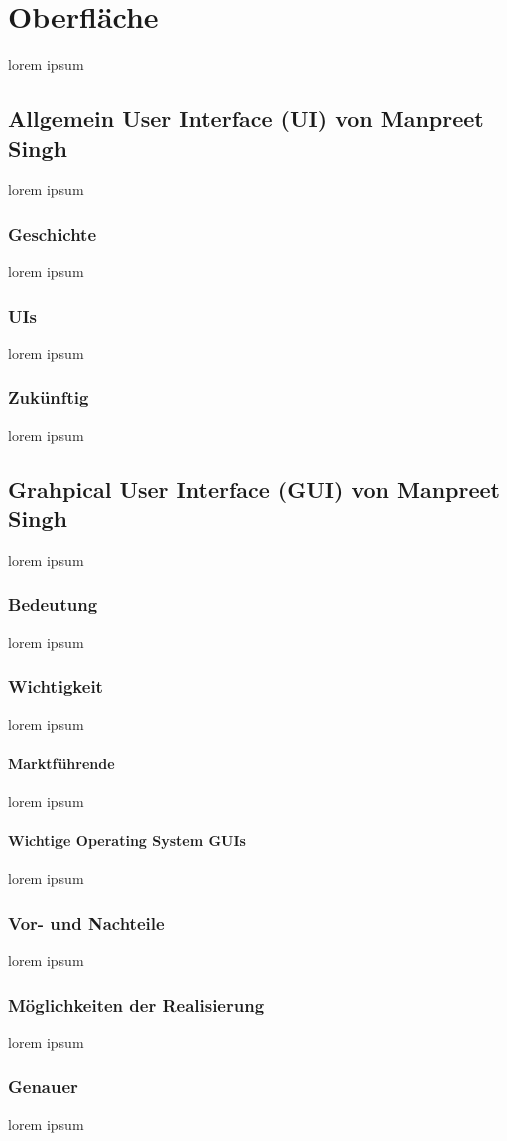\documentclass[12pt,a4paper]{report}
\begin{document}
\chapter{Oberfläche}
lorem ipsum
\section{Allgemein User Interface (UI) von Manpreet Singh}
lorem ipsum
\subsection{Geschichte}
lorem ipsum
\subsection{UIs}
lorem ipsum 
\subsection{Zukünftig}
lorem ipsum 
\section{Grahpical User Interface (GUI) von Manpreet Singh}
lorem ipsum
\subsection{Bedeutung}
lorem ipsum
\subsection{Wichtigkeit}
lorem ipsum
\subsubsection{Marktführende}
lorem ipsum
\subsubsection{Wichtige Operating System GUIs}
lorem ipsum
\subsection{Vor- und Nachteile}
lorem ipsum
\subsection{Möglichkeiten der Realisierung}
lorem ipsum
\subsection{Genauer}
lorem ipsum
\end{document}

